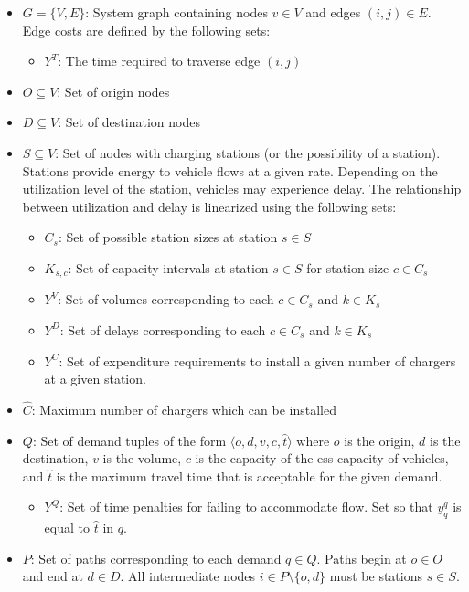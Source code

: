 \begin{itemize}
	\item $G = \{V, E\}$: System graph containing nodes $v \in V$ and edges $(i, j) \in E$. Edge costs are defined by the following sets: \begin{itemize}
		\item $Y^T$: The time required to traverse edge $(i, j)$
	\end{itemize}
	\item $O \subseteq V$: Set of origin nodes
	\item $D \subseteq V$: Set of destination nodes
	\item $S \subseteq V$: Set of nodes with charging stations (or the possibility of a station). Stations provide energy to vehicle flows at a given rate. Depending on the utilization level of the station, vehicles may experience delay. The relationship between utilization and delay is linearized using the following sets: \begin{itemize}
		\item $C_s$: Set of possible station sizes at station $s \in S$
		\item $K_{s, c}$: Set of capacity intervals at station $s \in S$ for station size $c \in C_s$
		\item $Y^V$: Set of volumes corresponding to each $c \in C_s$ and $k \in K_s$
		\item $Y^D$: Set of delays corresponding to each $c \in C_s$ and $k \in K_s$ 
		\item $Y^C$: Set of expenditure requirements to install a given number of chargers at a given station.
	\end{itemize}
	\item $\hat{C}$: Maximum number of chargers which can be installed
	\item $Q$: Set of demand tuples of the form $\langle o, d, v, c, \hat{t} \rangle$ where $o$ is the origin, $d$ is the destination, $v$ is the volume, $c$ is the capacity of the \gls{ess} capacity of vehicles, and $\hat{t}$ is the maximum travel time that is acceptable for the given demand. \begin{itemize}
		\item $Y^Q$: Set of time penalties for failing to accommodate flow. Set so that $y^q_q$ is equal to $\hat{t}$ in $q$.
	\end{itemize}
	\item $P$: Set of paths corresponding to each demand $q \in Q$. Paths begin at $o \in O$ and end at $d \in D$. All intermediate nodes $i \in P \setminus \{o, d\}$ must be stations $s \in S$.\begin{itemize}

\end{itemize}
\end{itemize}
